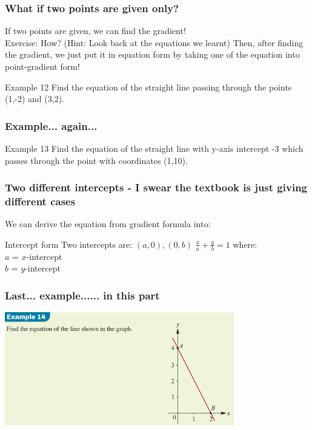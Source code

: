 \documentclass{beamer}
\begin{document}
\begin{frame}[t]
    \frametitle{What if two points are given only?}
    If two points are given, we can find the gradient!\\
    Exercise: How? (Hint: Look back at the equations we learnt)
    Then, after finding the gradient, we just put it in equation form by taking one of the equation into point-gradient form!\\
    \begin{block}{Example 12}
        Find the equation of the straight line passing through the points (1,-2) and (3,2).
    \end{block}
\end{frame}

\begin{frame}[t]
    \frametitle{Example... again...}
    \begin{block}{Example 13}
        Find the equation of the straight line with y-axis intercept -3 which passes through the
        point with coordinates (1,10).
    \end{block}
\end{frame}

\begin{frame}
    \frametitle{Two different intercepts - I swear the textbook is just giving different cases}
    We can derive the equation from gradient formula into:\\
    \begin{block}{Intercept form}
        Two intercepts are: $(a,0), (0,b)$
        $\frac{x}{a} + \frac{y}{b} = 1$
        where:\\
        $a$ = $x$-intercept\\
        $b$ = $y$-intercept
    \end{block}
\end{frame}

\begin{frame}[t]
    \frametitle{Last... example...... in this part}
    \begin{center}
        \includegraphics[width = 10cm]{Ex14.png}
    \end{center}
\end{frame}
\begin{frame}
\end{frame}
\end{document}
